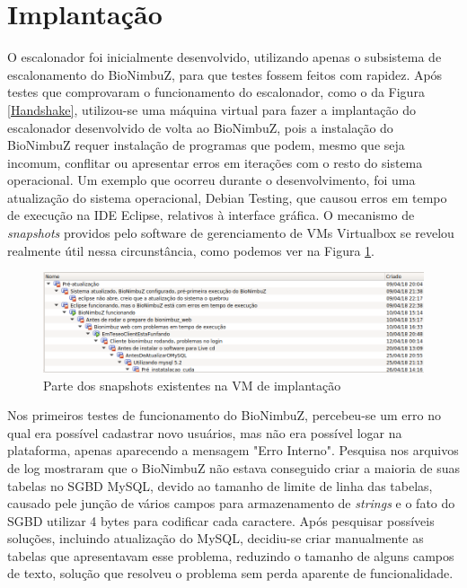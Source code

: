 \section{Implantação}

O escalonador foi inicialmente desenvolvido, utilizando apenas o subsistema de escalonamento do BioNimbuZ, para que testes fossem feitos com rapidez. Após testes que comprovaram o funcionamento do escalonador, como o da Figura \ref{Handshake}, utilizou-se uma máquina virtual para fazer a implantação do escalonador desenvolvido de volta ao BioNimbuZ, pois a instalação do BioNimbuZ requer instalação de programas que podem, mesmo que seja incomum, conflitar ou apresentar erros em iterações com o resto do sistema operacional. Um exemplo que ocorreu durante o desenvolvimento, foi uma atualização do sistema operacional, Debian\cite{Debian} Testing\cite{DebianTesting}, que causou erros em tempo de execução na \acrfull{IDE} Eclipse\cite{JavaEclipse}, relativos à interface gráfica. O mecanismo de \textit{snapshots} providos pelo software de gerenciamento de \acrshort{VM}s Virtualbox\cite{VirtualBox} se revelou realmente útil nessa circunstância, como podemos ver na Figura \ref{Snapshots}.

\begin{figure}[htbp]
	\centerline{\includegraphics[width=12cm]{img/Snapshots.png}}
	\caption{Parte dos snapshots existentes na \acrshort{VM} de implantação}
	\label{Snapshots}
\end{figure}

Nos primeiros testes de funcionamento do BioNimbuZ, percebeu-se um erro no qual era possível cadastrar novo usuários, mas não era possível logar na plataforma, apenas aparecendo a mensagem "Erro Interno". Pesquisa nos arquivos de log mostraram que o BioNimbuZ não estava conseguido criar a maioria de suas tabelas no \acrfull{SGBD} MySQL, devido ao tamanho de limite de linha das tabelas, causado pele junção de vários campos para armazenamento de \textit{strings} e o fato do \acrshort{SGBD} utilizar 4 bytes para codificar cada caractere. Após pesquisar possíveis soluções, incluindo atualização do MySQL, decidiu-se criar manualmente as tabelas que apresentavam esse problema, reduzindo o tamanho de alguns campos de texto, solução que resolveu o problema sem perda aparente de funcionalidade.

